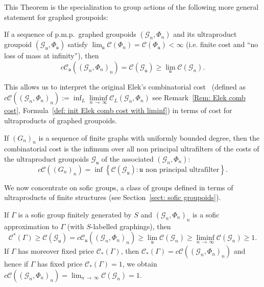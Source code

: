 \documentclass[AHL,Unicode,longabstracts,published]{cedram}
\newcommand{\cost}{\mathcal{C}}
\newcommand{\ccost}{c\mathcal{C}}
\newcommand{\cg}{\mathcal{G}}
\newcommand{\vraicost}{\mathscr{C}}
\newcommand{\ul}{\mathfrak{u}}
\newcommand{\pmp}{p.m.p.\ }
\begin{document}
This Theorem is the specialization to group actions of the following more general statement for graphed groupoids:
\begin{theo}
If a sequence of \pmp graphed groupoids $(\cg_n,\Phi_n)$ and its ultraproduct groupoid $(\cg_\ul,\Phi_\ul)$ satisfy $\lim_\ul \cost(\Phi_n) = \cost(\Phi_\ul) <\infty$ (i.e. finite cost and ``no loss of mass at infinity''), then
\[
\ccost_\ul\left(\left(\cg_n,\Phi_n\right)_n\right)=\cost(\cg_\ul)\geq\lim_{\ul}\cost(\cg_{n}).
\]
\end{theo}


This allows us to interpret the original Elek's combinatorial cost~\cite{Elek-combinatorial-cost-2007} (defined as $\ccost((\cg_n,\Phi_n)_n):=\inf_L\liminf\limits_{n\,\to\,\infty}\cost_L(\cg_n,\Phi_n)$ see Remark~\ref{Rem: Elek comb cost}, Formula~\eqref{def: init Elek comb cost with liminf}) in terms of cost for ultraproducts of graphed groupoids.
\begin{coro}
If $(G_n)_n$ is a sequence of finite graphs with uniformly bounded degree, then the combinatorial cost is the infimum over all non principal ultrafilters of the costs of the ultraproduct groupoids $\cg_\ul$ of the associated $(\cg_n,\Phi_n)$:
\begin{equation*}
\ccost\left((G_n)_n\right) = \inf \left\{\cost(\cg_{\ul}) : \ul \text{ non principal ultrafilter} \right\}.
\end{equation*}
\end{coro}


We now concentrate on sofic groups, a class of groups defined in terms of ultraproducts of finite structures (see Section~\ref{sect: sofic groupoids}).

\begin{coro}
If $\Gamma$ is a sofic group finitely generated by $S$ and $(\cg_n, \Phi_n)_n$ is a sofic approximation to $\Gamma$ (with $S$-labelled graphings), then
\begin{equation}
\vraicost^*(\Gamma)\geq \cost(\cg_\ul)=\ccost_\ul\left((\cg_n,\Phi_n)_n\right) \geq \lim_{\ul}\cost(\cg_{n})\geq \liminf_{n\,\to\,\infty}\cost(\cg_{n}) \geq 1.
\end{equation}
If $\Gamma$ has moreover fixed price $\vraicost_*(\Gamma)$, then $\vraicost_*(\Gamma)=\ccost((\cg_n,\Phi_n)_n) $ and hence if $\Gamma$ has fixed price $\vraicost_*(\Gamma)=1$, we obtain $\ccost((\cg_n,\Phi_n)_n) = \lim_{n\,\to\,\infty}\cost(\cg_{n}) = 1$.
\end{coro}
\end{document}
